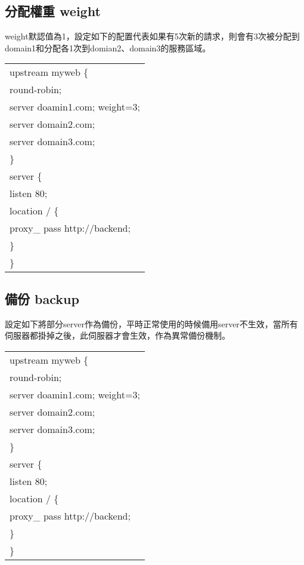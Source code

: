 \subsection{分配權重 weight}
\par
\renewcommand{\baselinestretch}{1} %
\twelve weight默認值為1，設定如下的配置代表如果有5次新的請求，則會有3次被分配到domain1和分配各1次到domian2、domain3的服務區域。
\par
\begin{center}
\begin{tabular}{||p{15cm}|} %
\hline
upstream myweb \{
\\
\qquad round-robin;
\\
\qquad server doamin1.com; \quad weight=3;
\\
\qquad server domain2.com;
\\
\qquad server domain3.com;
\\
\}
\\
server \{
\\
\qquad listen 80;
\\
\qquad location / \{
\\
\qquad \quad proxy\_ pass \quad http://backend;
\\
\quad \}
\\
\}
\\
\hline
\end{tabular}
\end{center}
\par

\renewcommand{\baselinestretch}{20} %
\subsection{備份 backup}
\par
\renewcommand{\baselinestretch}{1} %
\twelve 設定如下將部分server作為備份，平時正常使用的時候備用server不生效，當所有伺服器都掛掉之後，此伺服器才會生效，作為異常備份機制。
\par
\begin{center}
\begin{tabular}{||p{15cm}|} %
\hline
upstream myweb \{
\\
\qquad round-robin;
\\
\qquad server doamin1.com; \quad weight=3;
\\
\qquad server domain2.com;
\\
\qquad server domain3.com;
\\
\}
\\
server \{
\\
\qquad listen 80;
\\
\qquad location / \{
\\
\qquad \quad proxy\_ pass \quad http://backend;
\\
\quad \}
\\
\}
\\
\hline
\end{tabular}
\end{center}
\par

